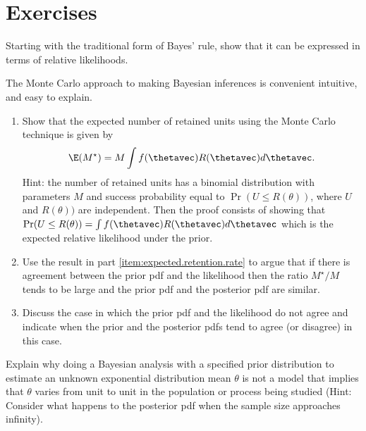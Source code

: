 \section*{Exercises}

\begin{exercise}
Starting with the  traditional form of Bayes' rule, show that it can
be expressed in terms of relative likelihoods.
\end{exercise}

\begin{exercise1}
The Monte Carlo approach to making Bayesian inferences is
convenient intuitive, and easy to explain.
\begin{enumerate}
\item
\label{item:expected.retention.rate}
Show that the expected number of retained units using the Monte Carlo
technique is given by
\begin{displaymath}
\E(M^{\star})=M \int f(\thetavec)R(\thetavec) d \thetavec.
\end{displaymath}
Hint: the number of retained units has a binomial distribution
with parameters $M$ and success probability equal to $\Pr(U \le
R(\theta))$, where $U$ and $R(\theta))$ are independent. Then the
proof consists of showing that $\Pr(U \le R(\theta))=\int
f(\thetavec)R(\thetavec) d \thetavec$ which is the expected relative
likelihood under the prior.
\item
Use the result in part \ref{item:expected.retention.rate} to argue
that if there is agreement between the prior pdf and the likelihood then
the ratio $M^{\star}/M$ tends to be large and the prior pdf and the
posterior pdf are similar.
\item
Discuss the case in which the prior pdf and the likelihood do not agree and
indicate when the prior and the posterior pdfs tend to agree (or disagree)
in this case.
\end{enumerate}
\end{exercise1}

\begin{exercise}
Explain why doing a Bayesian analysis with a specified prior
distribution to estimate an unknown exponential distribution mean $\theta$ is
not a model that implies that $\theta$ varies from unit to unit in the
population or process being studied (Hint: Consider what happens to
the posterior pdf when the sample size approaches infinity).
\end{exercise}

